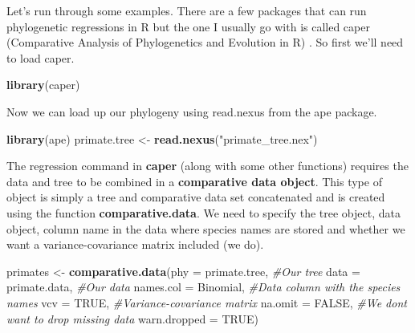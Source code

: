 \documentclass[
]{book}
\newenvironment{Shaded}{\begin{snugshade}}{\end{snugshade}}
\newcommand{\CommentTok}[1]{\textcolor[rgb]{0.56,0.35,0.01}{\textit{#1}}}
\newcommand{\DataTypeTok}[1]{\textcolor[rgb]{0.13,0.29,0.53}{#1}}
\newcommand{\KeywordTok}[1]{\textcolor[rgb]{0.13,0.29,0.53}{\textbf{#1}}}
\newcommand{\NormalTok}[1]{#1}
\newcommand{\OtherTok}[1]{\textcolor[rgb]{0.56,0.35,0.01}{#1}}
\newcommand{\StringTok}[1]{\textcolor[rgb]{0.31,0.60,0.02}{#1}}
\begin{document}
Let's run through some examples. There are a few packages that can run phylogenetic regressions in R but the one I usually go with is called caper (Comparative Analysis of Phylogenetics and Evolution in R) \citep{caper}. So first we'll need to load caper.

\begin{Shaded}
\begin{Highlighting}[]
\KeywordTok{library}\NormalTok{(caper)}
\end{Highlighting}
\end{Shaded}

Now we can load up our phylogeny using read.nexus from the ape package.

\begin{Shaded}
\begin{Highlighting}[]
\KeywordTok{library}\NormalTok{(ape)}
\NormalTok{primate.tree \textless{}{-}}\StringTok{ }\KeywordTok{read.nexus}\NormalTok{(}\StringTok{"primate\_tree.nex"}\NormalTok{)}
\end{Highlighting}
\end{Shaded}

The regression command in \textbf{caper} (along with some other functions) requires the data and tree to be combined in a \textbf{comparative data object}. This type of object is simply a tree and comparative data set concatenated and is created using the function \textbf{comparative.data}. We need to specify the tree object, data object, column name in the data where species names are stored and whether we want a variance-covariance matrix included (we do).

\begin{Shaded}
\begin{Highlighting}[]
\NormalTok{primates \textless{}{-}}\StringTok{ }\KeywordTok{comparative.data}\NormalTok{(}\DataTypeTok{phy =}\NormalTok{ primate.tree,     }\CommentTok{\#Our tree}
                             \DataTypeTok{data =}\NormalTok{ primate.data,    }\CommentTok{\#Our data}
                             \DataTypeTok{names.col =}\NormalTok{ Binomial,   }\CommentTok{\#Data column with the species names}
                             \DataTypeTok{vcv =} \OtherTok{TRUE}\NormalTok{,             }\CommentTok{\#Variance{-}covariance matrix}
                             \DataTypeTok{na.omit =} \OtherTok{FALSE}\NormalTok{,        }\CommentTok{\#We don\textquotesingle{}t want to drop missing data}
                             \DataTypeTok{warn.dropped =} \OtherTok{TRUE}\NormalTok{)}
\end{Highlighting}
\end{Shaded}
\end{document}
